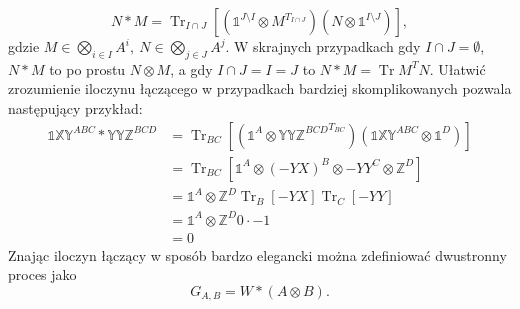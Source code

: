 \documentclass[10pt]{article} %
\DeclareMathOperator{\Trs}{Tr}
\newcommand{\X}{\mathbb{X}}
\newcommand{\Y}{\mathbb{Y}}
\newcommand{\Z}{\mathbb{Z}}
\newcommand{\I}{\mathbb{1}}
\begin{document}
\begin{equation}
N * M = \Trs_{I\cap J}\left[ (\I^{J\setminus I} \otimes M^{T_{I\cap J}})(N \otimes \I^{I\setminus J})\right],
\end{equation}
gdzie $M \in \bigotimes_{i \in I} A^i,~N \in \bigotimes_{j \in J} A^j$. W skrajnych przypadkach gdy $I \cap J = \emptyset$, $N*M$ to po prostu $N \otimes M$, a
gdy $I \cap J = I = J$ to $N * M = \Trs M^T N$. Ułatwić zrozumienie iloczynu łączącego w przypadkach bardziej skomplikowanych pozwala następujący przykład:
\begin{equation}
\begin{split}
\I\X\Y^{ABC} * \Y\Y\Z^{BCD} &= \Trs_{BC} \left[ \left(\I^{A} \otimes {\Y\Y\Z^{BCD}}^{T_{BC}}\right)\left(\I\X\Y^{ABC} \otimes \I^D\right)\right] \\
&= \Trs_{BC} \left[ \I^A \otimes (-YX)^{B} \otimes {-YY}^{C} \otimes \Z^{D}\right] \\
&= \I^{A} \otimes \Z^{D} \Trs_{B} \left[ -YX \right]\Trs_{C}\left[-YY\right] \\
&= \I^{A} \otimes \Z^{D} 0 \cdot -1 \\
&= 0
\end{split}
\end{equation}
Znając iloczyn łączący w sposób bardzo elegancki można zdefiniować dwustronny proces jako
\begin{equation}
G_{A,B} = W * (A \otimes B).
\end{equation}
\end{document}
